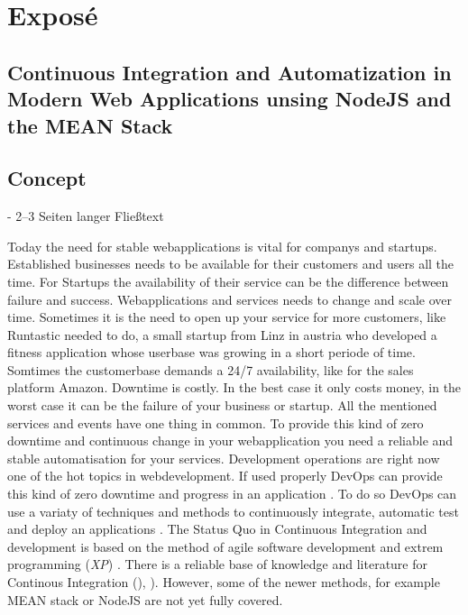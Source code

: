 \section{Exposé}

\subsection{Continuous Integration and Automatization in Modern Web Applications unsing NodeJS and the MEAN Stack}


\subsection{Concept}
- 2–3 Seiten langer Fließtext

Today the need for stable webapplications is vital for companys and startups. Established businesses needs to be
available for their customers and users all the time. For Startups the availability of their service can be the difference
between failure and success. Webapplications and services needs to change and scale over time. Sometimes it is the need
to open up your service for more customers, like Runtastic needed to do, a small startup from Linz in austria who developed
a fitness application whose userbase was growing in a short periode of time. Somtimes the customerbase demands a 24/7
availability, like for the sales platform Amazon. Downtime is costly. In the best case it only costs money, in the worst case
it can be the failure of your business or startup. All the mentioned services and events have one thing in common. To provide this kind of zero downtime and continuous change in
your webapplication you need a reliable and stable automatisation for your services. Development operations are right now one of
the hot topics in webdevelopment. If used properly DevOps can provide this kind of zero downtime and progress in an application
\cite{humble2010continuous} \cite{duvall2007continuous}. To do so DevOps can use a variaty of techniques and methods to continuously
integrate, automatic test and deploy an applications \cite{meyer2014continuous}.
The Status Quo in Continuous Integration and development is based on the method of agile software development and extrem programming
(\textit{XP}) \cite{lindstrom2004extreme}. There is a reliable base of knowledge and literature for Continous Integration
()\cite{schaefer2013continuous}, \cite{fowler2006continuous} \cite{fowler2012continuous}). However, some of the newer methods, for example
MEAN stack or NodeJS are not yet fully covered.
